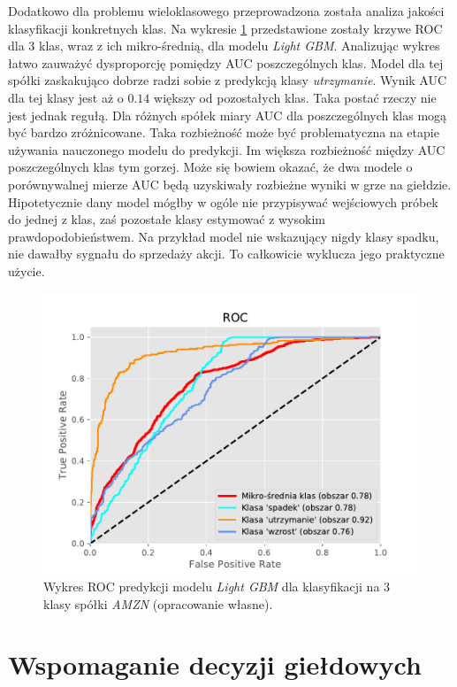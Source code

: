 \documentclass[a4paper, twoside, 11pt, openright]{article}
\begin{document}
Dodatkowo dla problemu wieloklasowego przeprowadzona została analiza jakości klasyfikacji konkretnych klas. Na wykresie \ref{img:lgbm_roc_amzn} przedstawione zostały krzywe ROC dla 3 klas, wraz z ich mikro-średnią, dla modelu \textit{Light GBM}. Analizując wykres łatwo zauważyć dysproporcję pomiędzy AUC poszczególnych klas. Model dla tej spółki zaskakująco dobrze radzi sobie z predykcją klasy \textit{utrzymanie}. Wynik AUC dla tej klasy jest aż o $0.14$ większy od pozostałych klas. Taka postać rzeczy nie jest jednak regułą. Dla różnych spółek miary AUC dla poszczególnych klas mogą być bardzo zróżnicowane. Taka rozbieżność może być problematyczna na etapie używania nauczonego modelu do predykcji. Im większa rozbieżność między AUC poszczególnych klas tym gorzej. Może się bowiem okazać, że dwa modele o porównywalnej mierze AUC będą uzyskiwały rozbieżne wyniki w grze na giełdzie. Hipotetycznie dany model mógłby w ogóle nie przypisywać wejściowych próbek do jednej z klas, zaś pozostałe klasy estymować z wysokim prawdopodobieństwem. Na przykład model nie wskazujący nigdy klasy spadku, nie dawałby sygnału do sprzedaży akcji. To całkowicie wyklucza jego praktyczne użycie.

\begin{figure}[H]
\centering \includegraphics[scale=0.8]{img/AMZN_roc_lgbm.pdf}
\caption{Wykres ROC predykcji modelu \textit{Light GBM} dla klasyfikacji na 3 klasy spółki \textit{AMZN} (opracowanie własne).}
\label{img:lgbm_roc_amzn}
\end{figure}

\newpage

\section{Wspomaganie decyzji giełdowych}
\end{document}
